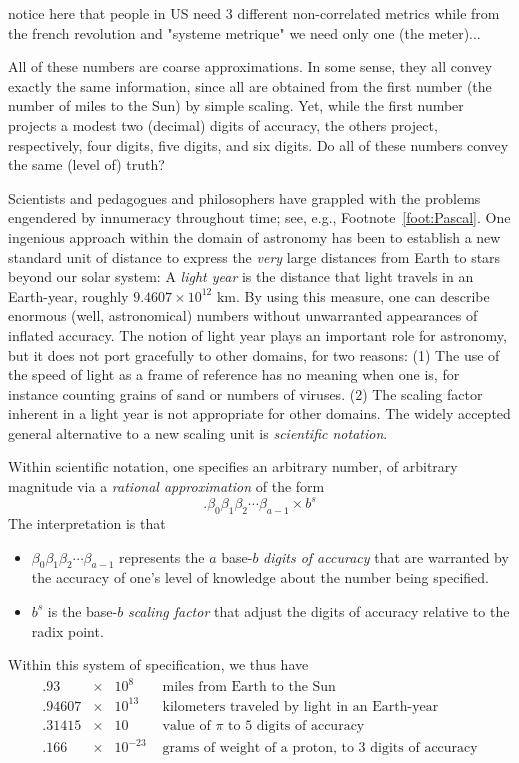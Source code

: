 {\Denis notice here that people in US need 3 different non-correlated metrics 
while from the french revolution and "systeme metrique" we need only one (the meter)...}

All of these numbers are coarse approximations.  In some sense, they
all convey exactly the same information, since all are obtained from
the first number (the number of miles to the Sun) by simple scaling.
Yet, while the first number projects a modest two (decimal) digits of
accuracy, the others project, respectively, four digits, five digits,
and six digits.  Do all of these numbers convey the same (level of)
truth?

\medskip

Scientists and pedagogues and philosophers have grappled with the
problems engendered by innumeracy throughout time; see, e.g.,
Footnote~\ref{foot:Pascal}.  One ingenious approach within the domain
of astronomy has been to establish a new standard unit of distance to
express the {\em very} large distances from Earth to stars beyond our
solar system: A {\em light year} is the distance that light travels in
an Earth-year, roughly $9.4607 \times 10^{12}$ km.  By using this
measure, one can describe enormous (well, astronomical) numbers
without unwarranted appearances of inflated accuracy.  The notion of
light year plays an important role for astronomy, but it does not port
gracefully to other domains, for two reasons: (1) The use of the speed
of light as a frame of reference has no meaning when one is, for
instance counting grains of sand or numbers of viruses.  (2) The
scaling factor inherent in a light year is not appropriate for other
domains.  The widely accepted general alternative to a new scaling
unit is {\em scientific notation}.  

Within scientific notation, one specifies an arbitrary number, of
arbitrary magnitude via a {\em rational approximation} of the form
\[ . \beta_0 \beta_1 \beta_2 \cdots \beta_{a-1} \times b^s \]
The interpretation is that
\begin{itemize}
\item
$\beta_0 \beta_1 \beta_2 \cdots \beta_{a-1}$ represents the $a$
  base-$b$ {\em digits of accuracy} that are warranted by the accuracy
  of one's level of knowledge about the number being specified.

\item
$b^s$ is the base-$b$ {\em scaling factor} that adjust the digits of
  accuracy relative to the radix point.
\end{itemize}
Within this system of specification, we thus have
\[ \begin{array}{lcll}
.93    & \times & 10^8     & \mbox{ miles from Earth to the Sun} \\
.94607 & \times & 10^{13}  & \mbox{ kilometers traveled by light in an Earth-year} \\
.31415 & \times & 10       & \mbox{ value of $\pi$ to $5$ digits of accuracy} \\
.166   & \times & 10^{-23} & \mbox{ grams of weight of a proton, to $3$ digits of accuracy}
\end{array}
\]

